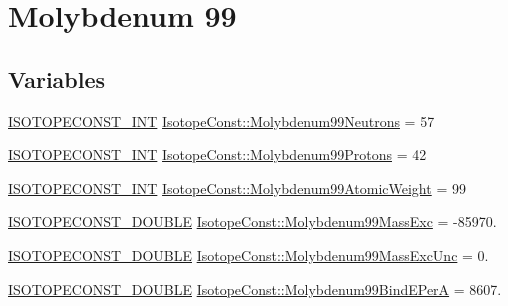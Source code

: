 \hypertarget{group___isotope_const-_molybdenum-_mo99}{}\section{Molybdenum 99}
\label{group___isotope_const-_molybdenum-_mo99}
\subsection*{Variables}
\begin{DoxyCompactItemize}
\item 
\mbox{\hyperlink{group___isotope_const-_macros_ga5f18360b3e99483a35c32d789e62621c}{I\+S\+O\+T\+O\+P\+E\+C\+O\+N\+S\+T\+\_\+\+I\+NT}} \mbox{\hyperlink{group___isotope_const-_molybdenum-_mo99_gaaab70bd1fe8334b6199195c4232800fe}{Isotope\+Const\+::\+Molybdenum99\+Neutrons}} = 57
\item 
\mbox{\hyperlink{group___isotope_const-_macros_ga5f18360b3e99483a35c32d789e62621c}{I\+S\+O\+T\+O\+P\+E\+C\+O\+N\+S\+T\+\_\+\+I\+NT}} \mbox{\hyperlink{group___isotope_const-_molybdenum-_mo99_ga73722173d91d68fb217d8846501f4970}{Isotope\+Const\+::\+Molybdenum99\+Protons}} = 42
\item 
\mbox{\hyperlink{group___isotope_const-_macros_ga5f18360b3e99483a35c32d789e62621c}{I\+S\+O\+T\+O\+P\+E\+C\+O\+N\+S\+T\+\_\+\+I\+NT}} \mbox{\hyperlink{group___isotope_const-_molybdenum-_mo99_gafb7a82bf47cefdade667b46e3c37ce9b}{Isotope\+Const\+::\+Molybdenum99\+Atomic\+Weight}} = 99
\item 
\mbox{\hyperlink{group___isotope_const-_macros_ga8f45a7272ce02c0b4c65c44636ed719a}{I\+S\+O\+T\+O\+P\+E\+C\+O\+N\+S\+T\+\_\+\+D\+O\+U\+B\+LE}} \mbox{\hyperlink{group___isotope_const-_molybdenum-_mo99_gabf1c984f5561dc5e5f8b05a2c130612e}{Isotope\+Const\+::\+Molybdenum99\+Mass\+Exc}} = -\/85970.
\item 
\mbox{\hyperlink{group___isotope_const-_macros_ga8f45a7272ce02c0b4c65c44636ed719a}{I\+S\+O\+T\+O\+P\+E\+C\+O\+N\+S\+T\+\_\+\+D\+O\+U\+B\+LE}} \mbox{\hyperlink{group___isotope_const-_molybdenum-_mo99_gaeb46cd49f39e62e4c1fae7f84dd2318b}{Isotope\+Const\+::\+Molybdenum99\+Mass\+Exc\+Unc}} = 0.
\item 
\mbox{\hyperlink{group___isotope_const-_macros_ga8f45a7272ce02c0b4c65c44636ed719a}{I\+S\+O\+T\+O\+P\+E\+C\+O\+N\+S\+T\+\_\+\+D\+O\+U\+B\+LE}} \mbox{\hyperlink{group___isotope_const-_molybdenum-_mo99_gaa4963d4f8ed0fa0d117d5937c37b2b28}{Isotope\+Const\+::\+Molybdenum99\+Bind\+E\+PerA}} = 8607.
\item 

\end{DoxyCompactItemize}
